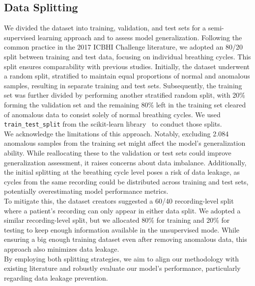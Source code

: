 \subsection{Data Splitting}
\label{method:data-splitting}
We divided the dataset into training, validation, and test sets for a semi-supervised learning approach and to assess model generalization. Following the common practice in the 2017 ICBHI Challenge literature, we adopted an 80/20 split between training and test data, focusing on individual breathing cycles. This split ensures comparability with previous studies.
Initially, the dataset underwent a random split, stratified to maintain equal proportions of normal and anomalous samples, resulting in separate training and test sets. Subsequently, the training set was further divided by performing another stratified random split, with 20\% forming the validation set and the remaining 80\% left in the training set cleared of anomalous data to consist solely of normal breathing cycles. We used \lstinline{train_test_split} from the scikit-learn library~\cite{pedregosa2011scikit} to conduct those splits.\\
We acknowledge the limitations of this approach. Notably, excluding 2.084 anomalous samples from the training set might affect the model's generalization ability. While reallocating these to the validation or test sets could improve generalization assessment, it raises concerns about data imbalance. Additionally, the initial splitting at the breathing cycle level poses a risk of data leakage, as cycles from the same recording could be distributed across training and test sets, potentially overestimating model performance metrics.\\
To mitigate this, the dataset creators suggested a 60/40 recording-level split where a patient's recording can only appear in either data split. We adopted a similar recording-level split, but we allocated 80\% for training and 20\% for testing to keep enough information available in the unsupervised mode. While ensuring a big enough training dataset even after removing anomalous data, this approach also minimizes data leakage.\\
By employing both splitting strategies, we aim to align our methodology with existing literature and robustly evaluate our model's performance, particularly regarding data leakage prevention.

